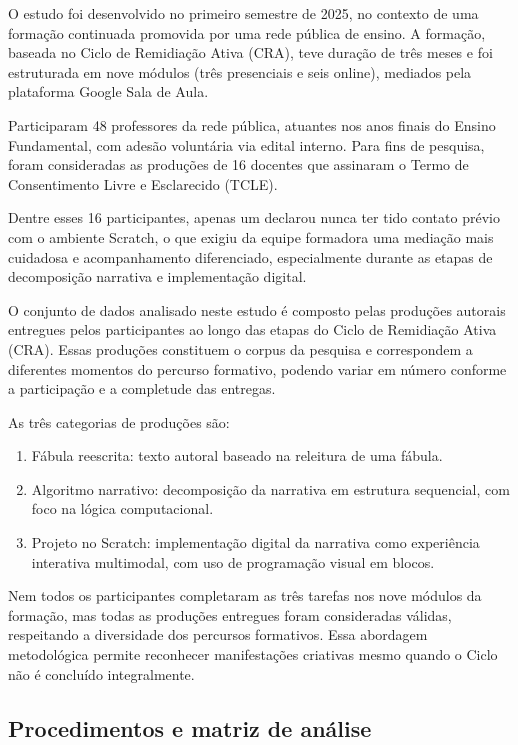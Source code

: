 \documentclass[portuguese]{textolivre}
\begin{document}
O estudo foi desenvolvido no primeiro semestre de 2025, no contexto de uma formação continuada promovida por uma rede pública de ensino. A formação, baseada no Ciclo de Remidiação Ativa (CRA), teve duração de três meses e foi estruturada em nove módulos (três presenciais e seis online), mediados pela plataforma Google Sala de Aula.

Participaram 48 professores da rede pública, atuantes nos anos finais do Ensino Fundamental, com adesão voluntária via edital interno. Para fins de pesquisa, foram consideradas as produções de 16 docentes que assinaram o Termo de Consentimento Livre e Esclarecido (TCLE).

Dentre esses 16 participantes, apenas um declarou nunca ter tido contato prévio com o ambiente Scratch, o que exigiu da equipe formadora uma mediação mais cuidadosa e acompanhamento diferenciado, especialmente durante as etapas de decomposição narrativa e implementação digital.

O conjunto de dados analisado neste estudo é composto pelas produções autorais entregues pelos participantes ao longo das etapas do Ciclo de Remidiação Ativa (CRA). Essas produções constituem o corpus da pesquisa e correspondem a diferentes momentos do percurso formativo, podendo variar em número conforme a participação e a completude das entregas.

As três categorias de produções são:

\begin{enumerate}[label=\alph*)]
\item	Fábula reescrita: texto autoral baseado na releitura de uma fábula.
\item	Algoritmo narrativo: decomposição da narrativa em estrutura sequencial, com foco na lógica computacional.
\item	Projeto no Scratch: implementação digital da narrativa como experiência interativa multimodal, com uso de programação visual em blocos.
\end{enumerate}

Nem todos os participantes completaram as três tarefas nos nove módulos da formação, mas todas as produções entregues foram consideradas válidas, respeitando a diversidade dos percursos formativos. Essa abordagem metodológica permite reconhecer manifestações criativas mesmo quando o Ciclo não é concluído integralmente.

\subsection{Procedimentos e matriz de análise}
\end{document}
